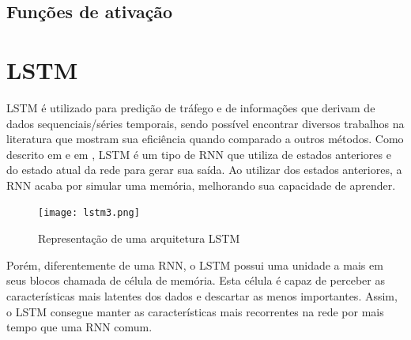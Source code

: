 \subsection{Funções de ativação}






\section{\acrfull{LSTM}}

\acrshort{LSTM} é utilizado para predição de tráfego e de informações que derivam de dados sequenciais/séries temporais, sendo possível encontrar diversos trabalhos na literatura que mostram sua eficiência quando comparado a outros métodos. Como descrito em \cite{Zainab_2018} e em \cite{Xiaolei_2015}, \acrshort{LSTM} é um tipo de \acrshort{RNN} que utiliza de estados anteriores e do estado atual da rede para gerar sua saída. Ao utilizar dos estados anteriores, a \acrshort{RNN} acaba por simular uma memória, melhorando sua capacidade de aprender. 

\begin{figure}[htb]
    \centering
    \texttt{[image: lstm3.png]}
    \label{figure:eixo}
    \caption[Representação de uma arquitetura LSTM]{Representação de uma arquitetura LSTM\footnotemark}
\end{figure}


Porém, diferentemente de uma \acrshort{RNN}, o LSTM possui uma unidade a mais em seus blocos chamada de célula de memória. Esta célula é capaz de perceber as características mais latentes dos dados e descartar as menos importantes. Assim, o \acrshort{LSTM} consegue manter as características mais recorrentes na rede por mais tempo que uma \acrshort{RNN} comum. 

